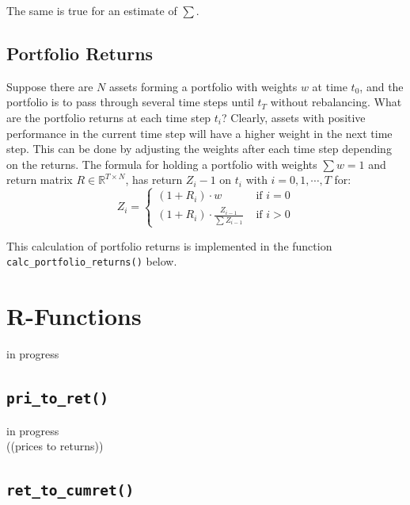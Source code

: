 \documentclass[
  oneside]{book}
\begin{document}
The same is true for an estimate of \(\textstyle\sum\).

\hypertarget{portfolioreturns}{%
\subsection{Portfolio Returns}\label{portfolioreturns}}

Suppose there are \(N\) assets forming a portfolio with weights \(w\) at time \(t_0\), and the portfolio is to pass through several time steps until \(t_T\) without rebalancing. What are the portfolio returns at each time step \(t_i\)? Clearly, assets with positive performance in the current time step will have a higher weight in the next time step. This can be done by adjusting the weights after each time step depending on the returns. The formula for holding a portfolio with weights \(\textstyle\sum w = 1\) and return matrix \(R \in \mathbb{R}^{T \times N}\), has return \(Z_i-1\) on \(t_i\) with \(i=0, 1, \cdots, T\) for:
\[
  Z_i =
  \begin{cases}
  (1+R_i)\cdot w &\text{ if }i=0\\
  (1+R_i)\cdot \frac{Z_{i-1}}{\sum Z_{i-1}} &\text{ if }i>0
  \end{cases}
\]

This calculation of portfolio returns is implemented in the function \texttt{calc\_portfolio\_returns()} below.

\hypertarget{r-functions-2}{%
\section{R-Functions}\label{r-functions-2}}

\textbar\textbar\textbar in progress\textbar\textbar\textbar{}\\

\hypertarget{pritoret}{%
\subsection{\texorpdfstring{\texttt{pri\_to\_ret()}}{pri\_to\_ret()}}\label{pritoret}}

\textbar\textbar\textbar in progress\textbar\textbar\textbar{}\\
((prices to returns))

\hypertarget{ret_to_cumret}{%
\subsection{\texorpdfstring{\texttt{ret\_to\_cumret()}}{ret\_to\_cumret()}}\label{ret_to_cumret}}
\end{document}
